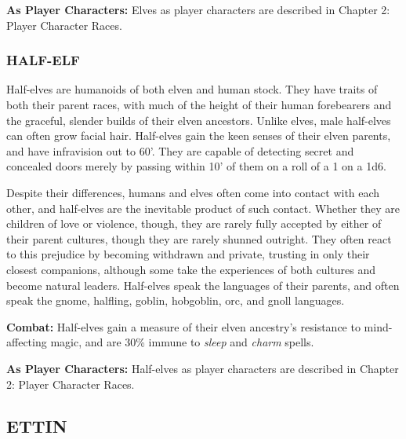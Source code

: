 \begin{multicols}{2}
\textbf{As Player Characters:} Elves as player characters are described in Chapter 2: Player Character Races.

\subsubsection{HALF-ELF}

Half-elves are humanoids of both elven and human stock. They have traits of both their parent races, with much of the height of their human forebearers and the graceful, slender builds of their elven ancestors. Unlike elves, male half-elves can often grow facial hair. Half-elves gain the keen senses of their elven parents, and have infravision out to 60'. They are capable of detecting secret and concealed doors merely by passing within 10' of them on a roll of a 1 on a 1d6.

Despite their differences, humans and elves often come into contact with each other, and half-elves are the inevitable product of such contact. Whether they are children of love or violence, though, they are rarely fully accepted by either of their parent cultures, though they are rarely shunned outright. They often react to this prejudice by becoming withdrawn and private, trusting in only their closest companions, although some take the experiences of both cultures and become natural leaders. Half-elves speak the languages of their parents, and often speak the gnome, halfling, goblin, hobgoblin, orc, and gnoll languages.

\textbf{Combat:} Half-elves gain a measure of their elven ancestry's resistance to mind-affecting magic, and are 30\% immune to \textit{sleep} and \textit{charm} spells.

\textbf{As Player Characters:} Half-elves as player characters are described in Chapter 2: Player Character Races.

\noindent \begin{minipage}{\columnwidth}

\vspace{1em}

\subsection{ETTIN}


\end{minipage}
\end{multicols}

